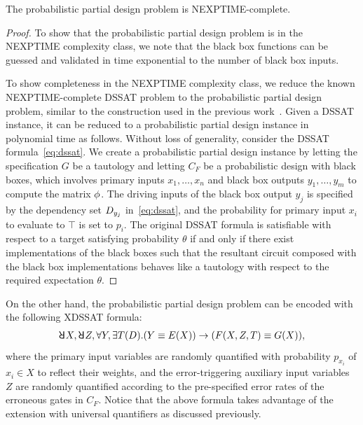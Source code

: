 \begin{theorem}
    The probabilistic partial design problem is NEXPTIME-complete.
\end{theorem}
\begin{proof}
    To show that the probabilistic partial design problem is in the NEXPTIME complexity class,
    we note that the black box functions can be guessed and validated in time exponential to the number of black box inputs.

    To show completeness in the NEXPTIME complexity class,
    we reduce the known NEXPTIME-complete DSSAT problem to the probabilistic partial design problem,
    similar to the construction used in the previous work~\cite{Gitina2013}.
    Given a DSSAT instance,
    it can be reduced to a probabilistic partial design instance in polynomial time as follows.
    Without loss of generality,
    consider the DSSAT formula~\cref{eq:dssat}.
    We create a probabilistic partial design instance by letting the specification $G$ be a tautology and
    letting $C_F$ be a probabilistic design with black boxes,
    which involves primary inputs $x_1,\ldots,x_n$ and black box outputs $y_1,\ldots,y_m$ to compute the matrix $\phi$.
    The driving inputs of the black box output $y_j$ is specified by the dependency set $D_{y_j}$ in~\cref{eq:dssat},
    and the probability for primary input $x_i$ to evaluate to $\top$ is set to $p_i$.
    The original DSSAT formula is satisfiable with respect to a target satisfying probability $\theta$ if and only if
    there exist implementations of the black boxes such that the resultant circuit composed with the black box implementations behaves like a tautology with respect to the required expectation $\theta$.
\end{proof}

On the other hand,
the probabilistic partial design problem can be encoded with the following XDSSAT formula:
\begin{align}
    \label{eq:dssat-partial-design}
    \random{} X,\random{} Z,\forall Y,\exists T(D).(Y \equiv E(X)) \limply (F(X,Z,T)\equiv G(X)),
\end{align}
where the primary input variables are randomly quantified with probability $p_{x_i}$ of $x_i \in X$ to reflect their weights,
and the error-triggering auxiliary input variables $Z$ are randomly quantified according to the pre-specified error rates of the erroneous gates in $C_F$.
Notice that the above formula takes advantage of the extension with universal quantifiers as discussed previously.

